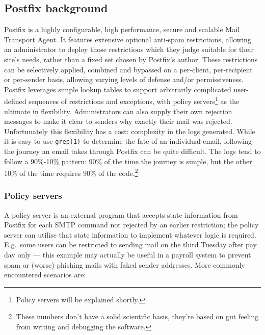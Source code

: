 \documentclass[a4paper,12pt,draft]{article}
\begin{document}
\subsection{Postfix background}

Postfix is a highly configurable, high performance, secure and scalable
Mail Transport Agent.  It features extensive optional anti-spam
restrictions, allowing an administrator to deploy those restrictions which
they judge suitable for their site's needs, rather than a fixed set chosen
by Postfix's author.  These restrictions can be selectively applied,
combined and bypassed on a per-client, per-recipient or per-sender basis,
allowing varying levels of defense and/or permissiveness.  Postfix
leverages simple lookup tables to support arbitrarily complicated
user-defined sequences of restrictions and exceptions, with policy
servers\footnote{Policy servers will be explained shortly.} as the ultimate
in flexibility.  Administrators can also supply their own rejection
messages to make it clear to senders why exactly their mail was rejected.
Unfortunately this flexibility has a cost: complexity in the logs
generated.  While it is easy to use \texttt{grep(1)} to determine the fate
of an individual email, following the journey an email takes through
Postfix can be quite difficult.  The logs tend to follow a 90\%-10\%
pattern: 90\% of the time the journey is simple, but the other 10\% of the
time requires 90\% of the code.\footnote{These numbers don't have a solid
scientific basis, they're based on gut feeling from writing and debugging
the software.}

\subsubsection{Policy servers}

A policy server \cite{policy-servers} is an external program that accepts
state information from Postfix for each SMTP command not rejected by an
earlier restriction; the policy server can utilise that state information
to implement whatever logic is required.  E.g.\ some users can be
restricted to sending mail on the third Tuesday after pay day only --- this
example may actually be useful in a payroll system to prevent spam or
(worse) phishing mails with faked sender addresses.  More commonly
encountered scenarios are:
\end{document}
